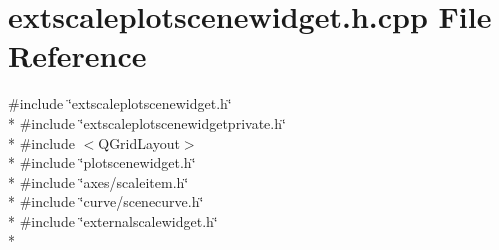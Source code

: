 \section{extscaleplotscenewidget.\+h.\+cpp File Reference}
\label{extscaleplotscenewidget_2extscaleplotscenewidget_8h_8cpp}
{\ttfamily \#include \char`\"{}extscaleplotscenewidget.\+h\char`\"{}}\\*
{\ttfamily \#include \char`\"{}extscaleplotscenewidgetprivate.\+h\char`\"{}}\\*
{\ttfamily \#include $<$Q\+Grid\+Layout$>$}\\*
{\ttfamily \#include \char`\"{}plotscenewidget.\+h\char`\"{}}\\*
{\ttfamily \#include \char`\"{}axes/scaleitem.\+h\char`\"{}}\\*
{\ttfamily \#include \char`\"{}curve/scenecurve.\+h\char`\"{}}\\*
{\ttfamily \#include \char`\"{}externalscalewidget.\+h\char`\"{}}\\*
